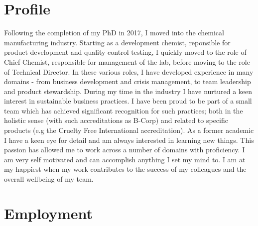 \documentclass[]{friggeri-cv}
\begin{document}
\section{Profile}
Following the completion of my PhD in 2017, I moved into the chemical manufacturing industry. Starting as a development chemist, reponsible for product development and quality control
testing, I quickly moved to the role of Chief Chemist, responsible for management of the lab, before moving to the role of Technical Director.
In these various roles, I have developed experience in many domains - from business development and crisis management, to team leadership and product stewardship.
During my time in the industry I have nurtured a keen interest in sustainable business practices. I have been proud to be part of a small team which has achieved 
significant recognition for such practices; both in the holistic sense (with such accreditations as B-Corp) and related to specific products (e.g the Cruelty Free International accreditation). 
As a former academic I have a keen eye for detail and am always interested in learning new things. 
This passion has allowed me to work across a number of domains with proficiency. 
I am very self motivated and can accomplish anything I set my mind to. I am at my happiest when my work contributes to the success of my colleagues and the overall wellbeing of my team. 

\section{Employment}
\end{document}
